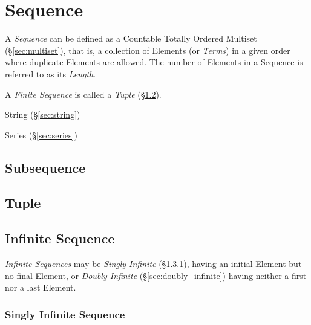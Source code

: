 \section{Sequence}\label{sec:sequence}

A \emph{Sequence} can be defined as a Countable Totally Ordered
Multiset (\S\ref{sec:multiset}), that is, a collection of Elements (or
\emph{Terms}) in a given order where duplicate Elements are allowed.
The number of Elements in a Sequence is referred to as its
\emph{Length}.

A \emph{Finite Sequence} is called a \emph{Tuple} (\S\ref{sec:tuple}).

String (\S\ref{sec:string})

Series (\S\ref{sec:series})



\subsection{Subsequence}\label{sec:subsequence}

\subsection{Tuple}\label{sec:tuple}

\subsection{Infinite Sequence}\label{sec:infinite_sequence}

\emph{Infinite Sequences} may be \emph{Singly Infinite}
(\S\ref{sec:singly_infinite}), having an initial Element but no final
Element, or \emph{Doubly Infinite} (\S\ref{sec:doubly_infinite})
having neither a first nor a last Element.



\subsubsection{Singly Infinite Sequence}\label{sec:singly_infinite}


